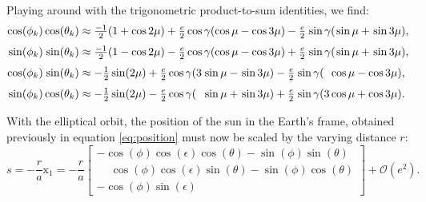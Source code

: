 \documentclass[12pt]{article}
\newcommand{\Sin}{%
  \mathop{\sbox0{$\cos$}\makebox[\wd0][r]{$\sin$}}%
}
\begin{document}
Playing around with the trigonometric product-to-sum identities, we find:
\begin{align}
    \cos (\phi_k) \cos (\theta_k) &\approx \tfrac{-1}{2} (1+\cos2\mu) 
        + \tfrac{e}{2} \cos\gamma( \cos\mu - \cos3\mu) 
        - \tfrac{e}{2} \Sin\gamma( \Sin\mu + \Sin3\mu),
        \label{eq:coscos}\\[3pt]
    \Sin (\phi_k) \Sin (\theta_k) &\approx \tfrac{-1}{2} (1-\cos2\mu) 
        - \tfrac{e}{2} \cos\gamma (\cos\mu - \cos3\mu)
        + \tfrac{e}{2} \Sin\gamma (\Sin\mu + \Sin3\mu),
        \label{eq:sinsin}\\[3pt]
    \cos (\phi_k) \Sin (\theta_k) &\approx -\tfrac{1}{2} \sin(2\mu) 
        + \tfrac{e}{2} \cos\gamma (3\Sin\mu - \Sin3\mu)
        - \tfrac{e}{2} \Sin\gamma (\phantom{3}\cos\mu - \cos3\mu),
        \label{eq:cossin}\\[3pt]
    \Sin (\phi_k) \cos (\theta_k) &\approx -\tfrac{1}{2} \sin(2\mu) 
        - \tfrac{e}{2} \cos\gamma (\phantom{3}\Sin\mu + \Sin3\mu)
        + \tfrac{e}{2} \Sin\gamma (3\cos\mu + \cos3\mu).
        \label{eq:sincos}
\end{align}

With the elliptical orbit, the position of the sun in the Earth's frame, 
obtained previously in equation \eqref{eq:position} must now be scaled by 
the varying distance $r$:
\begin{equation}
    s = -\frac{r}{a} \mathrm{x}_1 =
    -\frac{r}{a}\begin{bmatrix}
        -\cos(\phi)\cos(\epsilon)\cos(\theta) - \sin(\phi)\sin(\theta)\\
        \phantom{+}\cos(\phi)\cos(\epsilon)\sin(\theta)-\sin(\phi) \cos(\theta)\\
        -\cos(\phi)\sin(\epsilon)\phantom{\sin(\theta)+\sin(\phi) \cos(\theta)}
    \end{bmatrix}+\mathcal{O}(e^2).
    \label{eq:positionEllipse}
\end{equation}
\end{document}
